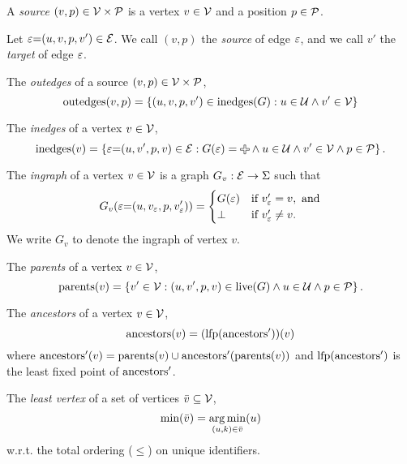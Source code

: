 \begin{definition}
  A \emph{source} $(v, p) \in \V \times \P$ is a vertex $v \in \V$ and a position $p \in \P$.
\end{definition}

Let $\e{=}(u, v, p, v') \in \E$.
We call $(v, p)$ the \emph{source} of edge $\e$,
and we call $v'$ the \emph{target} of edge $\e$.

\begin{definition}
  The \emph{outedges} of a source $(v, p) \in \V \times \P$,
  \[
    \outedges{v}{p} = \SetOf{(u, v, p, v') \in \inedges{G} \SuchThat{u \in \U \land v' \in \V }}
  \]
\end{definition}

\begin{definition}
  The \emph{inedges} of a vertex $v \in \V$,
  \[
    \inedges{v} = \SetOf{\e{=}(u, v', p, v) \in \E \SuchThat{G(\e) = \Plus \land u \in \U \land v' \in \V \land p \in \P}}.
  \]
\end{definition}

\begin{definition}
  The \emph{ingraph} of a vertex $v \in \V$ is a graph $G_v : \E \rightarrow \Sigma$
  such that
  \[
    G_v(\e{=}(u, v_\e, p, v_\e')) =
    \begin{cases}
      G(\e) & \text{if } v_\e' = v, \text{ and} \\
      \bot  & \text{if } v_\e' \neq v. \\
    \end{cases}
  \]
  We write $G_v$ to denote the ingraph of vertex $v$.
\end{definition}

\begin{definition}
  The \emph{parents} of a vertex $v \in \V$,
  \[
    \parents{v} = \SetOf{v' \in \V \SuchThat{(u, v', p, v) \in \live{G} \land u \in \U \land p \in \P}}.
  \]
\end{definition}

\begin{definition}
  The \emph{ancestors} of a vertex $v \in \V$,
  \[
    \ancestors{v} = \mathopen{}\left( \lfp{\ancestorsPrimeOp} \right)\mathclose{}(v)
  \]
  where $\ancestorsPrime{v} = \parents{v} \cup \ancestorsPrime{\parents{v}}$
  and $\lfp{\ancestorsPrimeOp}$ is the least fixed point of $\ancestorsPrimeOp$.
\end{definition}

\begin{definition}
  The \emph{least vertex} of a set of vertices $\Q{v} \subseteq \V$,
  \[
    \min{\Q{v}} = \argmin{(u, k) \in \Q{v}}{u}
  \]
  w.r.t. the total ordering ($\leq$) on unique identifiers.
\end{definition}

